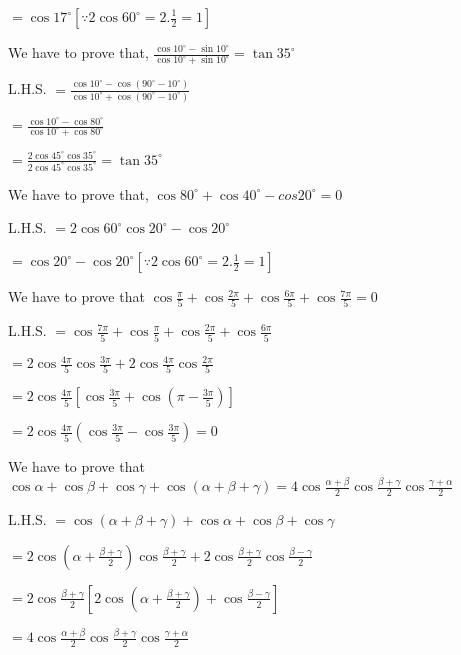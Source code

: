   $= \cos 17^\circ[\because 2\cos60^\circ = 2.\frac{1}{2} = 1]$

\item We have to prove that, $\frac{\cos 10^\circ - \sin 10^\circ}{\cos 10^\circ + \sin 10^\circ} = \tan 35^\circ$

  L.H.S. $= \frac{\cos10^\circ - \cos(90^\circ - 10^\circ)}{\cos10^\circ + \cos(90^\circ - 10^\circ)}$

  $= \frac{\cos10^\circ - \cos80^\circ}{\cos10^\circ + \cos80^\circ}$

  $= \frac{2\cos45^\circ\cos35^\circ}{2\cos45^\circ\cos35^\circ} = \tan 35^\circ$

\item We have to prove that, $\cos 80^\circ + \cos 40^\circ - cos 20^\circ = 0$

  L.H.S. $= 2\cos60^\circ\cos20^\circ - \cos20^\circ$

  $= \cos20^\circ - \cos20^\circ[\because 2\cos60^\circ = 2.\frac{1}{2} = 1]$

\item We have to prove that $\cos\frac{\pi}{5} + \cos \frac{2\pi}{5} + \cos\frac{6\pi}{5} + \cos \frac{7\pi}{5} = 0$

  L.H.S. $= \cos\frac{7\pi}{5} + \cos\frac{\pi}{5} + \cos\frac{2\pi}{5} + \cos\frac{6\pi}{5}$

  $= 2\cos\frac{4\pi}{5}\cos\frac{3\pi}{5} + 2\cos\frac{4\pi}{5}\cos\frac{2\pi}{5}$

  $= 2\cos\frac{4\pi}{5}\left[\cos\frac{3\pi}{5} + \cos \left(\pi - \frac{3\pi}{5}\right)\right]$

  $= 2\cos\frac{4\pi}{5}\left(\cos\frac{3\pi}{5} - \cos \frac{3\pi}{5}\right) = 0$

\item We have to prove that $\cos\alpha + \cos\beta + \cos\gamma + \cos(\alpha + \beta + \gamma) = 4\cos\frac{\alpha +
  \beta}{2}\cos\frac{\beta + \gamma}{2}\cos \frac{\gamma + \alpha}{2}$

  L.H.S. $= \cos(\alpha + \beta + \gamma) + \cos\alpha + \cos\beta + \cos\gamma$

  $= 2\cos\left(\alpha + \frac{\beta + \gamma}{2}\right)\cos\frac{\beta + \gamma}{2} +
  2\cos\frac{\beta+\gamma}{2}\cos\frac{\beta - \gamma}{2}$

  $= 2\cos\frac{\beta + \gamma}{2}\left[2\cos\left(\alpha +\frac{\beta + \gamma}{2}\right) + \cos\frac{\beta -
      \gamma}{2}\right]$

  $=4\cos\frac{\alpha + \beta}{2}\cos\frac{\beta + \gamma}{2}\cos \frac{\gamma + \alpha}{2}$

